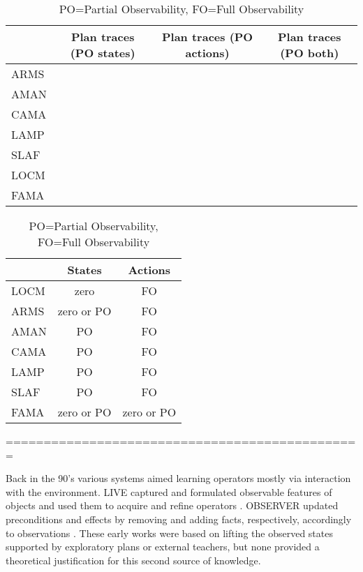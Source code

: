 \begin{table}
	\small
	\centering
	\begin{tabular}{ l | c | c | c |}
		& \multicolumn{1}{|p{2cm}|}{Plan traces (PO states)}
		& \multicolumn{1}{|p{2cm}|}{Plan traces (PO actions)}
		& \multicolumn{1}{|p{2cm}|}{Plan traces (PO both)}   \\
		\hline			
		ARMS & \checkmark & & \\
		AMAN & \checkmark & & \\
		CAMA & \checkmark & & \\
		LAMP & \checkmark & & \\
		SLAF & \checkmark & & \\
		LOCM & \checkmark & & \\
		FAMA & \checkmark & \checkmark & \checkmark \\
	\end{tabular}
	\caption{PO=Partial Observability, FO=Full Observability}
	\label{table:input_comparison2}
\end{table}	


\begin{table}
	\small
	\centering
	\begin{tabular}{ l | c | c |}
		& States 
		& Actions  \\
		\hline
		LOCM & zero & FO\\		
		ARMS & zero or PO & FO \\
		AMAN & PO & FO \\
		CAMA & PO & FO \\
		LAMP & PO & FO \\
		SLAF & PO & FO \\		
		FAMA & zero or PO & zero or PO \\
	\end{tabular}
	\caption{PO=Partial Observability, FO=Full Observability}
	\label{table:input_comparison3}
\end{table}	

===============================================

Back in the 90's various systems aimed learning operators mostly via interaction with the environment. {\sc LIVE} captured and formulated observable features of objects and used them to acquire and refine operators \cite{ShenS89}. {\sc OBSERVER} updated preconditions and effects by removing and adding facts, respectively, accordingly to observations \cite{Wang95learningby}. These early works were based on lifting the observed states supported by exploratory plans or external teachers, but none provided a theoretical justification for this second source of knowledge.

